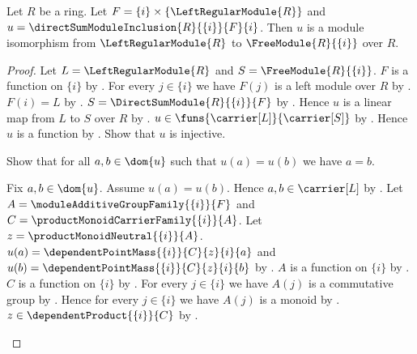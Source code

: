 \begin{theorem}\label{singleton_free_module_inclusion_isomorphism}
    Let $R$ be a ring.
    Let $F=\{i\}\times\{\LeftRegularModule{R}\}$ and
        $u=\directSumModuleInclusion{R}{\{i\}}{F}{i}$.
    Then $u$ is a module isomorphism from $\LeftRegularModule{R}$ to
        $\FreeModule{R}{\{i\}}$ over $R$.
\end{theorem}
\begin{proof}
    Let $L=\LeftRegularModule{R}$ and
        $S=\FreeModule{R}{\{i\}}$.
    $F$ is a function on $\{i\}$ by
        .
    For every $j\in\{i\}$ we have $F(j)$ is a left module over $R$ by
        .
    $F(i)=L$ by
        .
    $S=\DirectSumModule{R}{\{i\}}{F}$ by
        .
    Hence $u$ is a linear map from $L$ to $S$ over $R$ by
        .
    $u\in\funs{\carrier[L]}{\carrier[S]}$ by
        .
    Hence $u$ is a function by .
    Show that $u$ is injective.
    \begin{subproof}
        Show that for all $a,b\in\dom{u}$ such that $u(a)=u(b)$
            we have $a=b$.
        \begin{subproof}
            Fix $a,b\in\dom{u}$.
            Assume $u(a)=u(b)$.
            Hence $a,b\in\carrier[L]$ by
                .
            Let $A=\moduleAdditiveGroupFamily{\{i\}}{F}$ and
                $C=\productMonoidCarrierFamily{\{i\}}{A}$.
            Let $z=\productMonoidNeutral{\{i\}}{A}$.
            $u(a)=\dependentPointMass{\{i\}}{C}{z}{i}{a}$ and
                $u(b)=\dependentPointMass{\{i\}}{C}{z}{i}{b}$ by
                .
            $A$ is a function on $\{i\}$ by
                .
            $C$ is a function on $\{i\}$ by
                .
            For every $j\in\{i\}$ we have $A(j)$ is a commutative group by
                .
            Hence for every $j\in\{i\}$ we have $A(j)$ is a monoid by
                .
            $z\in\dependentProduct{\{i\}}{C}$ by
                .

\end{subproof}
\end{subproof}
\end{proof}
